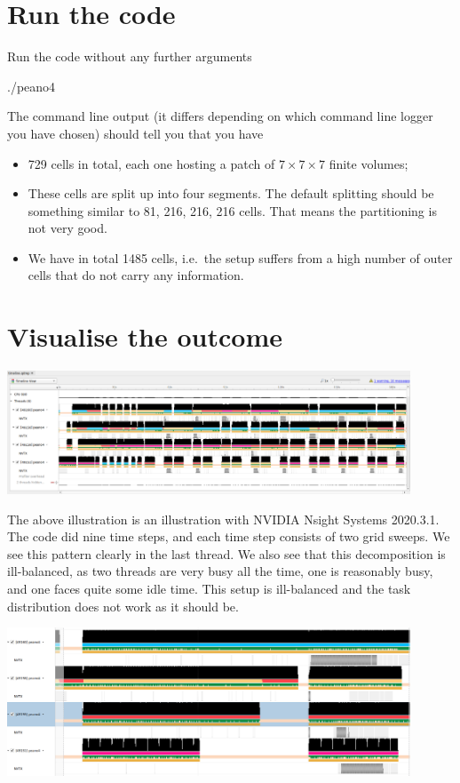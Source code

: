 \section{Run the code}

Run the code without any further arguments 
\begin{code}
./peano4
\end{code}

\noindent
The command line output (it differs depending on which command line logger you
have chosen) should tell you that you have
\begin{itemize}
  \item 729 cells in total, each one hosting a patch of $7 \times 7 \times 7$
  finite volumes;
  \item These cells are split up into four segments. The default splitting
  should be something similar to 81, 216, 216, 216 cells. That means the
  partitioning is not very good.
  \item We have in total 1485 cells, i.e.~the setup suffers from a high number
  of outer cells that do not carry any information.
\end{itemize}


\section{Visualise the outcome}

\begin{center}
 \includegraphics[width=0.9\textwidth]{21_task-priorities/nsight.png}
\end{center}

\noindent
The above illustration is an illustration with NVIDIA Nsight Systems 2020.3.1.
The code did nine time steps, and each time step consists of two grid sweeps. 
We see this pattern clearly in the last thread. 
We also see that this decomposition is ill-balanced, as two threads are very
busy all the time, one is reasonably busy, and one faces quite some idle time.
This setup is ill-balanced and the task distribution does not work as it should
be.

\begin{center}
 \includegraphics[width=0.9\textwidth]{21_task-priorities/zoom-in.png}
\end{center}


